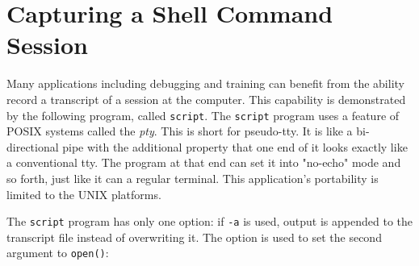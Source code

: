 
\section{Capturing a Shell Command Session}

Many applications including debugging and training can benefit from the
ability record a transcript of a session at the computer. This
capability is demonstrated by the following program, called
\texttt{script}. The \texttt{script} program uses a feature of POSIX
systems called the \textit{pty}. This is short for
pseudo-tty. It is like a bi-directional pipe with the
additional property that one end of it looks exactly like a
conventional tty. The program at that end can set it into
"no-echo" mode and so forth, just like it
can a regular terminal. This application's portability
is limited to the UNIX platforms.

The \texttt{script} program has only one option: if \texttt{{}-a} is
used, output is appended to the transcript file instead of overwriting
it. The option is used to set the second argument to \texttt{open()}: 


